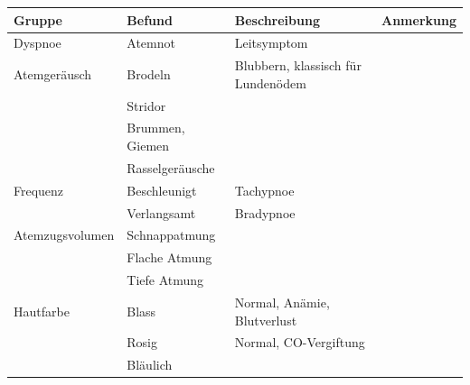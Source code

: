 \documentclass{article}
\begin{document}
\begin{center}
\begin{tabular}{|m{3.225cm}|m{3.225cm}|m{3.225cm}|m{3.225cm}|}
\hline
\centering Gruppe\par

 &
\centering Befund\par

 &
\centering Beschreibung\par

 &
\centering Anmerkung\par

\\\hline
Dyspnoe

 &
Atemnot

 &
Leitsymptom

 &
\\\hline
Atemger\"ausch

 &
Brodeln

 &
Blubbern, klassisch f\"ur Lunden\"odem

 &
\\\hline
 &
Stridor

 &
 &
\\\hline
 &
Brummen, Giemen

 &
 &
\\\hline
 &
Rasselger\"ausche

 &
 &
\\\hline
Frequenz

 &
Beschleunigt

 &
Tachypnoe

 &
\\\hline
 &
Verlangsamt

 &
Bradypnoe

 &
\\\hline
Atemzugsvolumen

 &
Schnappatmung

 &
 &
\\\hline
 &
Flache Atmung

 &
 &
\\\hline
 &
Tiefe Atmung

 &
 &
\\\hline
Hautfarbe

 &
Blass

 &
Normal, An\"amie, Blutverlust

 &
\\\hline
 &
Rosig

 &
Normal, CO-Vergiftung

 &
\\\hline
 &
Bl\"aulich 


\end{tabular}
\end{center}
\end{document}
